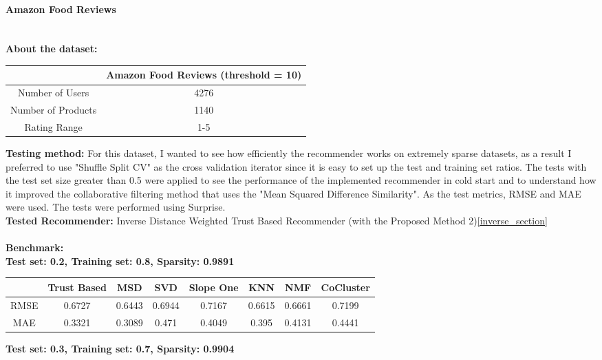 \paragraph{Amazon Food Reviews \cite{Amazonfoodreviews}} \mbox{}\\
\textbf{About the dataset:} 
\begin{center}
	\begin{tabular}{ | c | c |}
		\hline
		&Amazon Food Reviews (threshold = 10)  \\  
		\hline
		Number of Users & 4276 \\
		\hline
		Number of Products & 1140 \\
		\hline
		Rating Range & 1-5 \\
		\hline
	\end{tabular}
\end{center} 
\vspace{0.5cm}
\textbf{Testing method:} For this dataset, I wanted to see how efficiently the recommender works on extremely sparse datasets, as a result I preferred to use "Shuffle Split CV" as the cross validation iterator since it is easy to set up the test and training set ratios. The tests with the test set size greater than 0.5 were applied to see the performance of the implemented recommender in cold start and to understand how it improved the collaborative filtering method that uses the "Mean Squared Difference Similarity". As the test metrics, RMSE and MAE were used. The tests were performed using Surprise.\\
\textbf{Tested Recommender:} Inverse Distance Weighted Trust Based Recommender (with the Proposed Method 2)\ref{inverse_section} \\ \\
\textbf{Benchmark:} \\
\textbf{Test set: 0.2, Training set: 0.8, Sparsity: 0.9891}
\begin{center}
	\begin{tabular}{ | c | c | c | c | c | c | c | c |}
		\hline
		& Trust Based & MSD & SVD & Slope One & KNN & NMF & CoCluster\\ 
		\hline
		RMSE&0.6727  & 0.6443  & 0.6944  & 0.7167  & 0.6615  & 0.6661  & 0.7199\\
		\hline
		MAE&0.3321  & 0.3089  & 0.471  & 0.4049  & 0.395  & 0.4131  & 0.4441\\
		\hline
	\end{tabular}
\end{center} 
\vspace{1cm}
\textbf{Test set: 0.3, Training set: 0.7, Sparsity: 0.9904}
